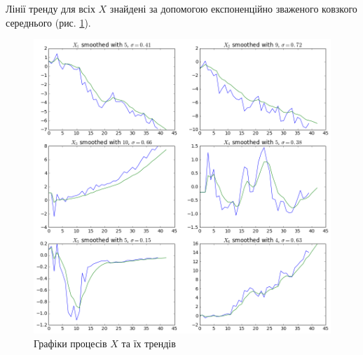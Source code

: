 Лінії тренду для всіх $X$ знайдені за допомогою
експоненційно зваженого ковзкого середнього (рис. \ref{fig:x:trends}).
\begin{figure}[h!]
  \centering
  \includegraphics[width=\textwidth]{Coursework2_files/Coursework2_7_0.png}
  \caption{Графіки процесів $X$ та їх трендів}
  \label{fig:x:trends}
\end{figure}


